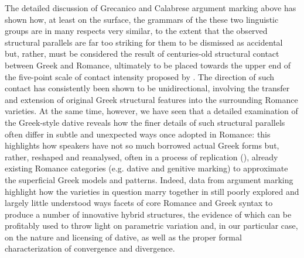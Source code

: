 \documentclass[output=paper,modfonts,nonflat,colorlinks,citecolor=brown]{langsci/langscibook}
\begin{document}
The detailed discussion of Grecanico and Calabrese argument marking above has shown how, at least on the surface, the grammars of the these two linguistic groups are in many respects very similar, to the extent that the observed structural parallels are far too striking for them to be dismissed as accidental but, rather, must be considered the result of centuries-old structural contact between Greek and Romance, ultimately to be placed towards the upper end of the five-point scale of contact intensity proposed by \citet{ThomasonKaufman1988}. The direction of such contact has consistently been shown to be unidirectional, involving the transfer and extension of original Greek structural features into the surrounding Romance varieties. At the same time, however, we have seen that a detailed examination of the Greek-style dative reveals how the finer details of such structural parallels often differ in subtle and unexpected ways once adopted in Romance: this highlights how speakers have not so much borrowed actual Greek forms but, rather, reshaped and reanalysed, often in a process of replication (\citealt{HeineKuteva2003, HeineKuteva2005}), already existing Romance categories (e.g. dative and genitive marking) to approximate the superficial Greek models and patterns. Indeed, data from argument marking highlight how the varieties in question marry together in still poorly explored and largely little understood ways facets of core Romance and Greek syntax to produce a number of innovative hybrid structures, the evidence of which can be profitably used to throw light on parametric variation and, in our particular case, on the nature and licensing of dative, as well as the proper formal characterization of convergence and divergence. 
\end{document}
